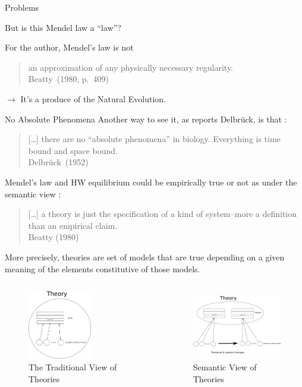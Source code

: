 \documentclass{beamer}
\begin{document}
\begin{frame}{Problems}
	\begin{alertblock}
		{But is this Mendel law  a ``law''?}
	\end{alertblock}

	For the author, Mendel's law is not
	\begin{quote}
		an approximation of any physically necessary regularity.\\
		Beatty~(1980, p.~409)
	\end{quote}
	$\rightarrow$ It's a produce of the Natural Evolution.
\end{frame}


\begin{frame}{No Absolute Phenomena}
	Another way to see it, as reports Delbrück, is that :
	\begin{quote}
		[\ldots] there are no ``absolute phenomena'' in biology. Everything is time bound and space bound. \\
		Delbrück~(1952)
	\end{quote}
\end{frame}


\begin{frame}
	Mendel's law and HW equilibrium could be empirically true or not as under the semantic view :
	\vfill
	\begin{quote}
		[\ldots]	a theory is just the specification of a kind of system--more a definition than an empirical claim. \\
		Beatty (1980)
	\end{quote}

	
\end{frame}

\begin{frame}
	More precisely, theories are set of models that are true depending on a given meaning of the elements constitutive of those models.

	\begin{columns}
		\begin{figure}
			\includegraphics[height=3cm]{tradView.png}
			\caption{The Traditional View of Theories}
		\end{figure}

		\begin{figure}
			\includegraphics[height=3cm]{semView.png}
			\caption{Semantic View of Theories}
		\end{figure}
	\end{columns}
\end{frame}
\end{document}
